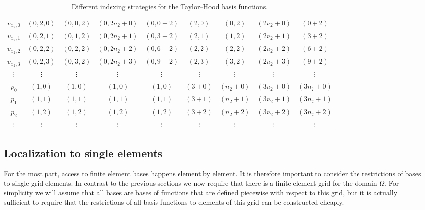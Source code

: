 \documentclass[a4paper,10pt,headings=normal,bibliography=totoc]{scrartcl}
\begin{document}
\begin{table}
\begin{center}
\begin{tabular}{c|c|c|c|c|c|c|c|c}
  \\
  $v_{x_2,0}$
    & $(0,2,0)$
    & $(0,0,2)$
    & $(0,2n_2+0)$
    & $(0,0+2)$
    & $(2,0)$
    & $(0,2)$
    & $(2n_2+0)$
    & $(0+2)$
    \\
  $v_{x_2,1}$
    & $(0,2,1)$
    & $(0,1,2)$
    & $(0,2n_2+1)$
    & $(0,3+2)$
    & $(2,1)$
    & $(1,2)$
    & $(2n_2+1)$
    & $(3+2)$
    \\
  $v_{x_2,2}$
    & $(0,2,2)$
    & $(0,2,2)$
    & $(0,2n_2+2)$
    & $(0,6+2)$
    & $(2,2)$
    & $(2,2)$
    & $(2n_2+2)$
    & $(6+2)$
    \\
  $v_{x_2,3}$
    & $(0,2,3)$
    & $(0,3,2)$
    & $(0,2n_2+3)$
    & $(0,9+2)$
    & $(2,3)$
    & $(3,2)$
    & $(2n_2+3)$
    & $(9+2)$
    \\
  $\vdots$ & $\vdots$ & $\vdots$ & $\vdots$ &  $\vdots$ & $\vdots$ & $\vdots$ & $\vdots$ & $\vdots$
  \\
  $p_{0}$
    & $(1,0)$
    & $(1,0)$
    & $(1,0)$
    & $(1,0)$
    & $(3+0)$
    & $(n_2+0)$
    & $(3n_2+0)$
    & $(3n_2+0)$
    \\
  $p_{1}$
    & $(1,1)$
    & $(1,1)$
    & $(1,1)$
    & $(1,1)$
    & $(3+1)$
    & $(n_2+1)$
    & $(3n_2+1)$
    & $(3n_2+1)$
    \\
  $p_{2}$
    & $(1,2)$
    & $(1,2)$
    & $(1,2)$
    & $(1,2)$
    & $(3+2)$
    & $(n_2+2)$
    & $(3n_2+2)$
    & $(3n_2+2)$
    \\
  $\vdots$ & $\vdots$ & $\vdots$ & $\vdots$ &  $\vdots$ & $\vdots$ & $\vdots$ & $\vdots$ & $\vdots$
  \\
  \hline
\end{tabular}
\end{center}
\caption{Different indexing strategies for the Taylor--Hood basis functions.}
\label{tab:th_indexing_variants}
\end{table}



\subsection{Localization to single elements}

For the most part, access to finite element bases happens element by element.  It is therefore important
to consider the restrictions of bases to single grid elements.  In contrast to the previous sections
we now require that there is a finite element grid for the domain $\Omega$. For simplicity we will
assume that all bases are bases of functions that are defined piecewise with respect to this grid,
but it is actually sufficient to require that the restrictions of all basis functions to elements
of this grid can be constructed cheaply.
\end{document}
